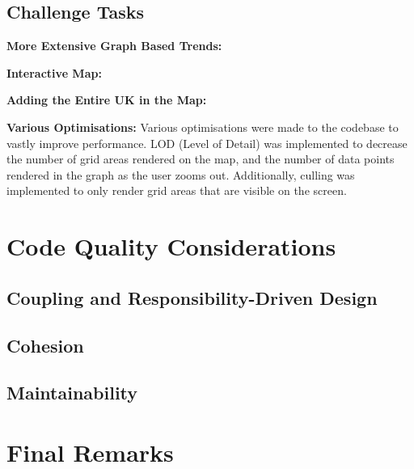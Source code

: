 \documentclass[10pt, a4paper]{scrartcl}
\begin{document}
\begin{multicols}{2}
        \subsection{Challenge Tasks}

        \noindent \textbf{More Extensive Graph Based Trends:}

        \noindent \textbf{Interactive Map:}

        \noindent \textbf{Adding the Entire UK in the Map:}

        \noindent \textbf{Various Optimisations:} Various optimisations were made to the codebase to vastly improve performance.
        LOD (Level of Detail) was implemented to decrease the number of grid areas rendered on the map, and the number of data points
        rendered in the graph as the user zooms out. Additionally, culling was implemented to only render grid areas that are visible
        on the screen.
       
        \section{Code Quality Considerations}

        \subsection{Coupling and Responsibility-Driven Design}
      
        \subsection{Cohesion}
        
        \subsection{Maintainability}
        
        \section{Final Remarks}
        
    \end{multicols}
\end{document}
